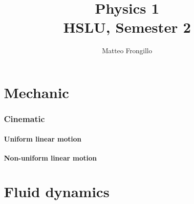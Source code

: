 \documentclass{article}
\title{\textbf{Physics 1 \\ HSLU, Semester 2}}
\author{Matteo Frongillo}
\date{}
\begin{document}
\maketitle
\tableofcontents
\pagebreak

\part{Mechanic}
\section{Cinematic}
\subsection{Uniform linear motion}


\subsection{Non-uniform linear motion}


\newpage
\part{Fluid dynamics}
    
\end{document}
